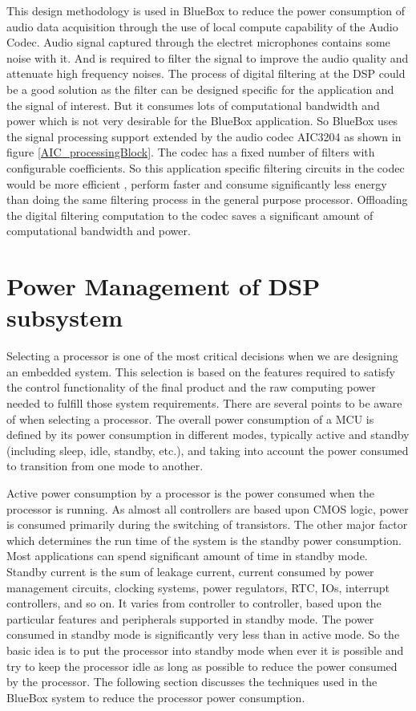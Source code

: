  This design methodology is used in BlueBox to reduce the power consumption of audio data acquisition through the use of local compute capability of the Audio Codec. Audio signal captured through the electret microphones contains some noise with it. And is required to filter the signal to improve the audio quality and attenuate high frequency noises. The process of digital filtering at the DSP could be a good solution as the filter can be designed specific for the application and the signal of interest. But it consumes lots of computational bandwidth and power which is not very desirable for the BlueBox application. So BlueBox uses the signal processing support extended by the audio codec AIC3204 as shown in figure \ref{AIC_processingBlock}. The codec has a fixed number of filters with configurable coefficients. So this application specific filtering circuits in the codec would be more efficient , perform faster and consume significantly less energy than doing the same filtering process in the general purpose processor. Offloading the digital filtering computation to the codec saves a significant amount of computational bandwidth and power.
 
\section{Power Management of DSP subsystem }

Selecting a processor is one of the most critical decisions when we are designing an embedded 
system. This selection is based on the features required to satisfy the control functionality of the final product and the raw computing power needed to fulfill those system requirements. There are several points to be aware of when selecting a processor. The overall power consumption of a MCU is defined by its power consumption in different modes, typically active and standby (including sleep, idle, standby, etc.),  and taking into account the power consumed to transition from one mode to another. 

Active power consumption by a processor is the power consumed when the processor is running. As almost all controllers are based upon CMOS logic, power is consumed primarily during the switching of transistors. The other major factor which determines the run time of the system is the standby power consumption. Most applications can spend significant amount of time in standby mode. Standby current is the sum of leakage current, current consumed by power management circuits, clocking systems, power regulators, RTC, IOs, interrupt controllers, and so on. It varies from controller to controller, based upon the particular features and peripherals supported in standby mode.  
The power consumed in standby mode is significantly very less than in active mode. So the basic idea is to put the processor into standby mode when ever it is possible and try to keep the processor idle as long as possible to reduce the power consumed by the processor. The following section discusses the techniques used in the BlueBox system to reduce the processor power consumption. 



